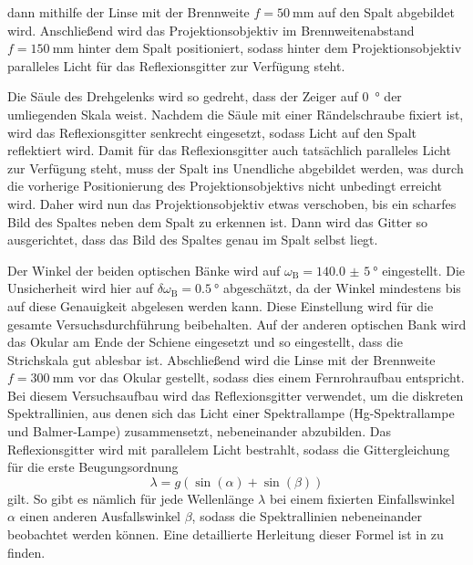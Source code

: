 dann mithilfe der Linse mit der Brennweite $f = \SI{50}{\milli \meter}$ auf den Spalt abgebildet wird. Anschließend wird das Projektionsobjektiv im Brennweitenabstand
$f = \SI{150}{\milli \meter}$ hinter dem Spalt positioniert, sodass hinter dem Projektionsobjektiv paralleles Licht für das Reflexionsgitter zur Verfügung steht.\par
Die Säule des Drehgelenks wird so gedreht, dass der Zeiger auf \SI{0}{\degree} der umliegenden Skala weist. Nachdem die Säule mit einer Rändelschraube fixiert ist,
wird das Reflexionsgitter senkrecht  eingesetzt, sodass Licht auf den Spalt reflektiert wird. Damit für das Reflexionsgitter auch tatsächlich paralleles Licht
zur Verfügung steht, muss der Spalt ins Unendliche abgebildet werden, was durch die vorherige Positionierung des Projektionsobjektivs nicht unbedingt erreicht wird.
Daher wird nun das Projektionsobjektiv etwas verschoben, bis ein scharfes Bild des Spaltes neben dem Spalt zu erkennen ist. Dann wird das Gitter so ausgerichtet,
dass das Bild des Spaltes genau im Spalt selbst liegt.\par
Der Winkel der beiden optischen Bänke wird auf $\omega_{\mathrm{B}} = \SI{140,0(5)}{\degree}$ eingestellt.
Die Unsicherheit wird hier auf $\delta \omega_{\mathrm{B}} = \SI{0,5}{\degree}$ abgeschätzt, da der Winkel mindestens bis auf diese Genauigkeit abgelesen werden kann.
Diese Einstellung wird für die gesamte Versuchsdurchführung beibehalten.
Auf der anderen optischen Bank wird das Okular am Ende der Schiene eingesetzt und so eingestellt, dass die Strichskala gut ablesbar ist. Abschließend wird die Linse
mit der Brennweite $f = \SI{300}{\milli \meter}$ vor das Okular gestellt, sodass dies einem Fernrohraufbau entspricht. Bei diesem Versuchsaufbau wird das Reflexionsgitter
verwendet, um die diskreten Spektrallinien, aus denen sich das Licht einer Spektrallampe (Hg-Spektrallampe und Balmer-Lampe) zusammensetzt, nebeneinander abzubilden.
Das Reflexionsgitter wird mit parallelem Licht bestrahlt, sodass die Gittergleichung für die erste Beugungsordnung
\begin{equation}\label{eq:gittergleichung}
    \lambda = g (\sin(\alpha) + \sin(\beta))
\end{equation} gilt. So gibt es nämlich für jede Wellenlänge $\lambda$ bei einem fixierten Einfallswinkel $\alpha$ einen anderen Ausfallswinkel $\beta$, sodass die Spektrallinien
nebeneinander beobachtet werden können. Eine detaillierte Herleitung dieser Formel ist in \cite{balmer_handblatt} zu finden.\newline
